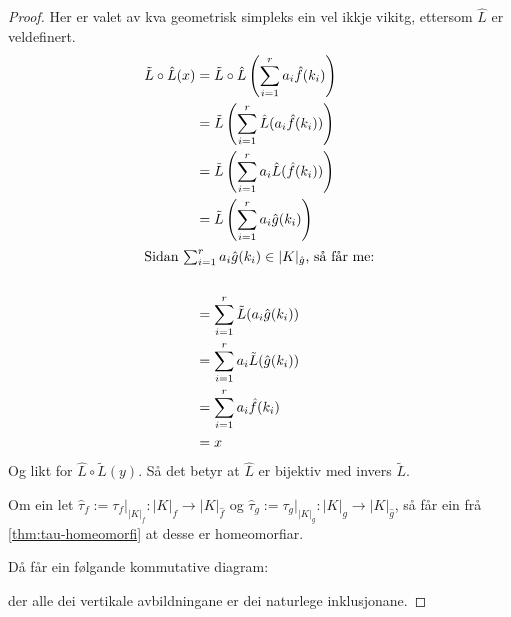 \documentclass[a4paper, 12pt, norsk]{article}
\theoremstyle{plain}
\theoremstyle{definition}
\newcommand{\Rb}{\mathbb{R}}
\newcommand{\gr}[1]{ \lvert #1 \rvert } %
\begin{document}
\begin{proof}
	Her er valet av kva geometrisk simpleks ein vel ikkje vikitg, ettersom $\hat{L}$ er veldefinert.
	\begin{align*}
		\tilde{L}\circ \hat{L}(x) &= \tilde{L}\circ \hat{L}\left(\sum_{i=1}^ra_i\hat{f}(k_i)\right) \\
		&= \tilde{L}\left(\sum_{i=1}^r\hat{L}(a_i\hat{f}(k_i))\right) \\
		&= \tilde{L}\left(\sum_{i=1}^ra_i\hat{L}(\hat{f}(k_i))\right) \\
		&= \tilde{L}\left(\sum_{i=1}^ra_i\hat{g}(k_i)\right) \\
		\intertext{Sidan $\sum_{i=1}^ra_i\hat{g}(k_i)\in\gr{K}_{\hat{g}}$, så får me:} \\
		&= \sum_{i=1}^r\tilde{L}(a_i\hat{g}(k_i)) \\
		&= \sum_{i=1}^ra_i\tilde{L}(\hat{g}(k_i)) \\
		&= \sum_{i=1}^ra_i\hat{f}(k_i) \\
		&= x
	\end{align*}
	Og likt for $\hat{L}\circ\tilde{L}(y)$. Så det betyr at $\hat{L}$ er bijektiv med invers $\tilde{L}$.
	
	Om ein let $\hat{\tau}_f:=\tau_f|_{\gr{K}_f} : \gr{K}_f \to \gr{K}_{\hat{f}}$ og $\hat{\tau}_g:=\tau_g|_{\gr{K}_g} : \gr{K}_g \to \gr{K}_{\hat{g}}$, så får ein frå \autoref{thm:tau-homeomorfi} at desse er homeomorfiar.
	
	Då får ein følgande kommutative diagram:
	\begin{center} %
	\end{center}
	der alle dei vertikale avbildningane er dei naturlege inklusjonane.


\end{proof}
\end{document}
